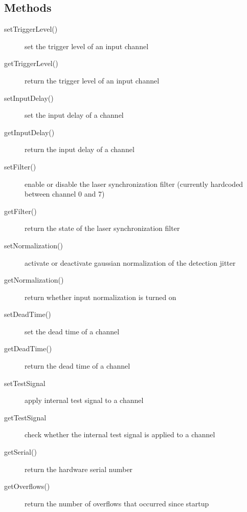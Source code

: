 \documentclass[letterpaper,10pt,english]{sphinxmanual}
\begin{document}
\subsection{Methods}
\label{sections/api:methods}\begin{description}
\item[{setTriggerLevel()}] \leavevmode
set the trigger level of an input channel

\item[{getTriggerLevel()}] \leavevmode
return the trigger level of an input channel

\item[{setInputDelay()}] \leavevmode
set the input delay of a channel

\item[{getInputDelay()}] \leavevmode
return the input delay of a channel

\item[{setFilter()}] \leavevmode
enable or disable the laser synchronization filter (currently hardcoded between channel 0 and 7)

\item[{getFilter()}] \leavevmode
return the state of the laser synchronization filter

\item[{setNormalization()}] \leavevmode
activate or deactivate gaussian normalization of the
detection jitter

\item[{getNormalization()}] \leavevmode
return whether input normalization is turned on

\item[{setDeadTime()}] \leavevmode
set the dead time of a channel

\item[{getDeadTime()}] \leavevmode
return the dead time of a channel

\item[{setTestSignal}] \leavevmode
apply internal test signal to a channel

\item[{getTestSignal}] \leavevmode
check whether the internal test signal is applied to a channel

\item[{getSerial()}] \leavevmode
return the hardware serial number

\item[{getOverflows()}] \leavevmode
return the number of overflows that occurred since startup

\end{description}
\end{document}
